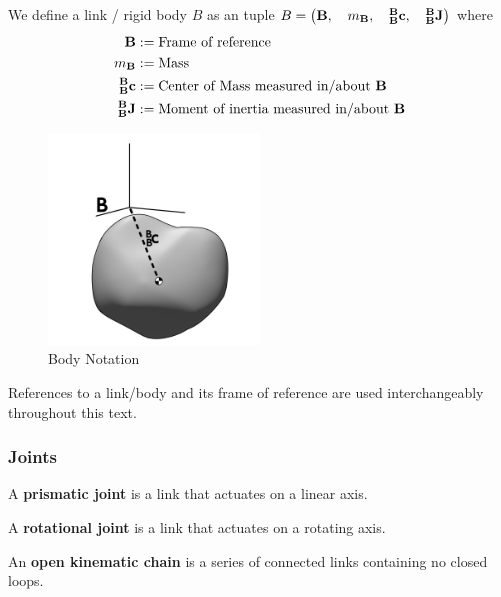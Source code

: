 \begin{definition}
We define a link / rigid body $B$ as an tuple $B = \left (\mathbf{B}, \quad m_{\mathbf{B}}, \quad ^\mathbf{B}_\mathbf{B}\mathbf{c}, \quad ^\mathbf{B}_\mathbf{B}\mathbf{J} \right )$ where
\begin{align*}
    \mathbf{B} &:= \text{Frame of reference} \\
    m_{\mathbf{B}} &:= \text{Mass} \\
    ^\mathbf{B}_\mathbf{B}\mathbf{c} &:= \text{Center of Mass measured in/about $\mathbf{B}$} \\
    ^\mathbf{B}_\mathbf{B}\mathbf{J} &:= \text{Moment of inertia measured in/about $\mathbf{B}$} \\
\end{align*}
\begin{figure}[H]
    \centering
    \includegraphics[width=0.5\textwidth]{Figures/Intro/BodyFrames.png}
    \caption{Body Notation}
    \label{fig:body_notation}
\end{figure}

\noindent References to a link/body and its frame of reference are used interchangeably throughout this text.
\end{definition}

\subsubsection{Joints}

\begin{definition}
A \textbf{prismatic joint} is a link that actuates on a linear axis.
\end{definition}

\begin{definition}
A \textbf{rotational joint} is a link that actuates on a rotating axis.
\end{definition}

\begin{definition}
An \textbf{open kinematic chain} is a series of connected links containing no closed loops.
\end{definition}


